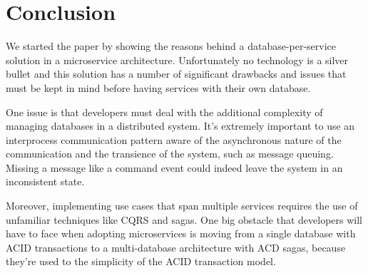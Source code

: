\documentclass[conference]{IEEEtran}
\begin{document}
%





\section{Conclusion}

We started the paper by showing the reasons behind a database-per-service solution in a microservice architecture. Unfortunately no technology is a silver bullet and this solution has a number of significant drawbacks and issues that must be kept in mind before having services with their own database.

One issue is that developers must deal with the additional complexity of managing databases in a distributed system. It's extremely important to use an interprocess communication pattern aware of the asynchronous nature of the communication and the transience of the system, such as message queuing. Missing a message like a command event could indeed leave the system in an inconsistent state.

Moreover, implementing use cases that span multiple services requires the use of unfamiliar techniques like CQRS and sagas. One big obstacle that developers will have to face when adopting microservices is moving from a single database with ACID transactions to a multi-database architecture with ACD sagas, because they’re used to the simplicity of the ACID transaction model.
\end{document}
